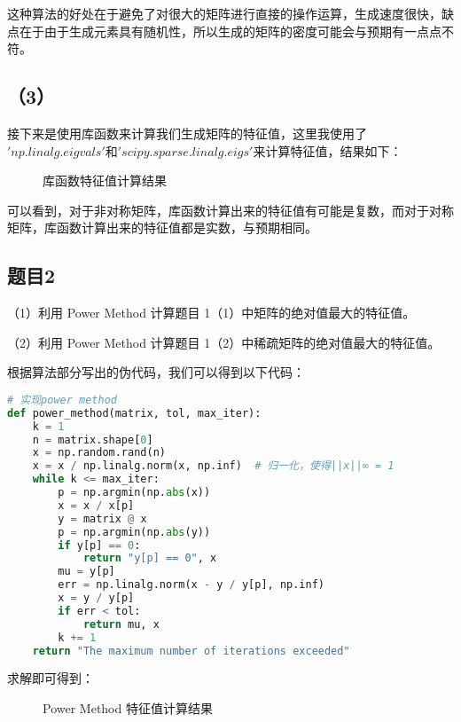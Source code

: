 \documentclass{source/Report}
\begin{document}
这种算法的好处在于避免了对很大的矩阵进行直接的操作运算，生成速度很快，缺点在于由于生成元素具有随机性，所以生成的矩阵的密度可能会与预期有一点点不符。

\subsection*{（3）}
接下来是使用库函数来计算我们生成矩阵的特征值，这里我使用了$'np.linalg.eigvals'$和$'scipy.sparse.linalg.eigs'$来计算特征值，结果如下：

\begin{figure}[htbp]
  \centering
  \label{fig:subfig}
  \caption{库函数特征值计算结果}
\end{figure}

可以看到，对于非对称矩阵，库函数计算出来的特征值有可能是复数，而对于对称矩阵，库函数计算出来的特征值都是实数，与预期相同。

\subsection{题目2}
（1）利用 Power Method 计算题目 1（1）中矩阵的绝对值最大的特征值。

（2）利用 Power Method 计算题目 1（2）中稀疏矩阵的绝对值最大的特征值。\\ \par

根据算法部分写出的伪代码，我们可以得到以下代码：

\begin{lstlisting}[language = Python, title = {Power Method 代码}]
# 实现power method
def power_method(matrix, tol, max_iter):
    k = 1
    n = matrix.shape[0]
    x = np.random.rand(n)
    x = x / np.linalg.norm(x, np.inf)  # 归一化，使得||x||∞ = 1
    while k <= max_iter:
        p = np.argmin(np.abs(x))
        x = x / x[p]
        y = matrix @ x
        p = np.argmin(np.abs(y))
        if y[p] == 0:
            return "y[p] == 0", x
        mu = y[p]
        err = np.linalg.norm(x - y / y[p], np.inf)
        x = y / y[p]
        if err < tol:
            return mu, x
        k += 1
    return "The maximum number of iterations exceeded"
\end{lstlisting}

求解即可得到：

\begin{figure}[htbp]
  \centering
  \label{fig:subfig}
  \caption{Power Method 特征值计算结果}
\end{figure}
\end{document}
